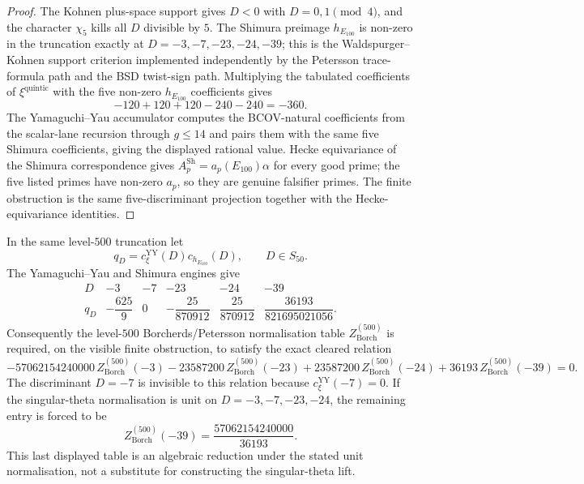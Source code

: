 \begin{proof}
The Kohnen plus-space support gives $D<0$ with $D=0,1\pmod 4$, and the
character $\chi_5$ kills all $D$ divisible by $5$. The Shimura preimage
$h_{E_{100}}$ is non-zero in the truncation exactly at
$D=-3,-7,-23,-24,-39$; this is the Waldspurger--Kohnen support
criterion implemented independently by the Petersson trace-formula path
and the BSD twist-sign path. Multiplying the tabulated coefficients of
$\xi^{\mathrm{quintic}}$ with the five non-zero
$h_{E_{100}}$ coefficients gives
\[
 -120+120+120-240-240=-360.
\]
The Yamaguchi--Yau accumulator computes the BCOV-natural coefficients
from the scalar-lane recursion through $g\le 14$ and pairs them with the
same five Shimura coefficients, giving the displayed rational value.
Hecke equivariance of the Shimura correspondence gives
$A^{\mathrm{Sh}}_p=a_p(E_{100})\alpha$ for every good prime; the five
listed primes have non-zero $a_p$, so they are genuine falsifier primes.
The finite obstruction is the same five-discriminant projection together
with the Hecke-equivariance identities.
\end{proof}

\begin{proposition}
\label{prop:quintic-E100-borcherds-normalisation-reduction}
In the same level-$500$ truncation let
\[
 q_D =
 c_{\xi}^{\mathrm{YY}}(D)c_{h_{E_{100}}}(D),
 \qquad
 D\in S_{50}.
\]
The Yamaguchi--Yau and Shimura engines give
\[
\begin{array}{c|ccccc}
D&-3&-7&-23&-24&-39\\
\hline
q_D&
-\dfrac{625}{9}&
0&
-\dfrac{25}{870912}&
\dfrac{25}{870912}&
\dfrac{36193}{821695021056}.
\end{array}
\]
Consequently the level-$500$ Borcherds/Petersson normalisation table
$Z_{\mathrm{Borch}}^{(500)}$ is required, on the visible finite
obstruction, to satisfy the exact cleared relation
\[
 -57062154240000\,Z_{\mathrm{Borch}}^{(500)}(-3)
 -23587200\,Z_{\mathrm{Borch}}^{(500)}(-23)
 +23587200\,Z_{\mathrm{Borch}}^{(500)}(-24)
 +36193\,Z_{\mathrm{Borch}}^{(500)}(-39)=0.
\]
The discriminant $D=-7$ is invisible to this relation because
$c_{\xi}^{\mathrm{YY}}(-7)=0$. If the singular-theta normalisation is
unit on $D=-3,-7,-23,-24$, the remaining entry is forced to be
\[
 Z_{\mathrm{Borch}}^{(500)}(-39)
 =
 \frac{57062154240000}{36193}.
\]
This last displayed table is an algebraic reduction under the stated
unit normalisation, not a substitute for constructing the singular-theta
lift.
\end{proposition}

